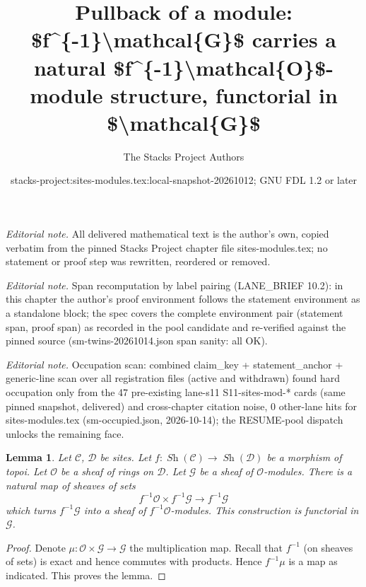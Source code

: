 \documentclass[10pt,a4paper]{amsart}
\title{Pullback of a module: \$f\textasciicircum{}\{-1\}\textbackslash{}mathcal\{G\}\$ carries a natural \$f\textasciicircum{}\{-1\}\textbackslash{}mathcal\{O\}\$-module structure, functorial in \$\textbackslash{}mathcal\{G\}\$}
\author{The Stacks Project Authors}
\date{stacks-project:sites-modules.tex:local-snapshot-20261012; GNU FDL 1.2 or later}
\theoremstyle{plain}
\newtheorem{lemma}[subsection]{Lemma}
\theoremstyle{definition}
\theoremstyle{remark}
\numberwithin{equation}{subsection}
\def\Sh{\mathop{\mathit{Sh}}\nolimits}
\begin{document}
\maketitle
\noindent\textit{Editorial note.} All delivered mathematical text is the author's own, copied verbatim from the pinned Stacks Project chapter file sites-modules.tex; no statement or proof step was rewritten, reordered or removed.\par\medskip
\noindent\textit{Editorial note.} Span recomputation by label pairing (LANE\_BRIEF 10.2): in this chapter the author's proof environment follows the statement environment as a standalone block; the spec covers the complete environment pair (statement span, proof span) as recorded in the pool candidate and re-verified against the pinned source (sm-twins-20261014.json span sanity: all OK).\par\medskip
\noindent\textit{Editorial note.} Occupation scan: combined claim\_key + statement\_anchor + generic-line scan over all registration files (active and withdrawn) found hard occupation only from the 47 pre-existing lane-s11 S11-sites-mod-* cards (same pinned snapshot, delivered) and cross-chapter citation noise, 0 other-lane hits for sites-modules.tex (sm-occupied.json, 2026-10-14); the RESUME-pool dispatch unlocks the remaining face.\par\medskip
\begin{lemma}
\label{lemma-pullback-module}
Let $\mathcal{C}$, $\mathcal{D}$ be sites.
Let $f : \Sh(\mathcal{C}) \to \Sh(\mathcal{D})$
be a morphism of topoi.
Let $\mathcal{O}$ be a sheaf of rings on $\mathcal{D}$.
Let $\mathcal{G}$ be a sheaf of $\mathcal{O}$-modules.
There is a natural map of sheaves of sets
$$
f^{-1}\mathcal{O} \times f^{-1}\mathcal{G}
\longrightarrow
f^{-1}\mathcal{G}
$$
which turns $f^{-1}\mathcal{G}$ into a sheaf of $f^{-1}\mathcal{O}$-modules.
This construction is functorial in $\mathcal{G}$.
\end{lemma}

\begin{proof}
Denote $\mu : \mathcal{O} \times \mathcal{G} \to \mathcal{G}$ the
multiplication map. Recall that $f^{-1}$ (on sheaves of sets) is exact
and hence commutes with products. Hence $f^{-1}\mu$ is a map as
indicated. This proves the lemma.
\end{proof}
\end{document}
